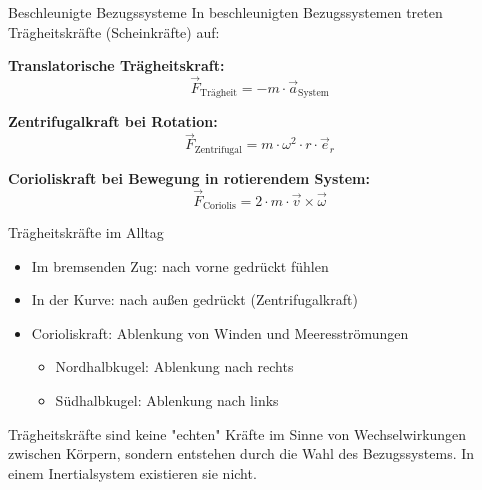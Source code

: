 \begin{concept}{Beschleunigte Bezugssysteme}
    In beschleunigten Bezugssystemen treten Trägheitskräfte (Scheinkräfte) auf:
    
    \textbf{Translatorische Trägheitskraft:}
    \begin{equation}
        \vec{F}_{\text{Trägheit}} = -m \cdot \vec{a}_{\text{System}}
    \end{equation}
    
    \textbf{Zentrifugalkraft bei Rotation:}
    \begin{equation}
        \vec{F}_{\text{Zentrifugal}} = m \cdot \omega^2 \cdot r \cdot \vec{e}_r
    \end{equation}
    
    \textbf{Corioliskraft bei Bewegung in rotierendem System:}
    \begin{equation}
        \vec{F}_{\text{Coriolis}} = 2 \cdot m \cdot \vec{v} \times \vec{\omega}
    \end{equation}
\end{concept}

\begin{example2}{Trägheitskräfte im Alltag}
    \begin{itemize}
        \item Im bremsenden Zug: nach vorne gedrückt fühlen
        \item In der Kurve: nach außen gedrückt (Zentrifugalkraft)
        \item Corioliskraft: Ablenkung von Winden und Meeresströmungen
        \begin{itemize}
            \item Nordhalbkugel: Ablenkung nach rechts
            \item Südhalbkugel: Ablenkung nach links
        \end{itemize}
    \end{itemize}
\end{example2}

\begin{remark}
    Trägheitskräfte sind keine "echten" Kräfte im Sinne von Wechselwirkungen zwischen Körpern, sondern entstehen durch die Wahl des Bezugssystems. In einem Inertialsystem existieren sie nicht.
\end{remark}